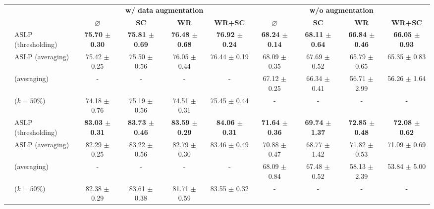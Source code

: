 \begin{table}[htbp]
  \centering
  \resizebox{16.5cm}{!} {
    \begin{tabular}{llcccccccc}
      \cmidrule[\heavyrulewidth]{3-10}
        &  & \multicolumn{4}{c}{\textbf{w/ data augmentation}} & \multicolumn{4}{c}{\textbf{w/o augmentation}} \\
       &  &  $\varnothing$ & \textbf{SC} & \textbf{WR} & \textbf{WR+SC} & $\varnothing$ & \textbf{SC} & \textbf{WR} & \textbf{WR+SC} \\
      \toprule

      \multirow{12}{*}{} \multirow{4}{*}{\textbf{Conv2}} & ASLP (thresholding) & \textbf{75.70 $\pm$ 0.30} & \textbf{75.81 $\pm$ 0.69} & \textbf{76.48 $\pm$ 0.68} & \textbf{76.92 $\pm$ 0.24} & \textbf{68.24 $\pm$ 0.14} &\textbf{ 68.11 $\pm$ 0.64} & \textbf{66.84 $\pm$ 0.46} & \textbf{66.05 $\pm$ 0.93} \\
        & ASLP (averaging)& 75.42 $\pm$ 0.25 & 75.50 $\pm$ 0.56 & 76.05 $\pm$ 0.44 & 76.44 $\pm$ 0.19 & 68.09 $\pm$ 0.35 & 67.69 $\pm$ 0.52 & 65.79 $\pm$ 0.65 & 65.35 $\pm$ 0.83 \\
        & \cite{DBLP:conf/nips/ZhouLLY19} (averaging)& - & - & - & - & 67.12 $\pm$ 0.25 & 66.34 $\pm$ 0.41 & 56.71 $\pm$ 2.99 & 56.26 $\pm$ 1.64 \\
        & \cite{DBLP:conf/cvpr/RamanujanWKFR20} ($k=50\%$) & 74.18 $\pm$ 0.76 & 75.19 $\pm$ 0.56 & 74.51 $\pm$ 0.31 & 75.45 $\pm$ 0.44 & - & - & - & - \\
      \midrule

       \multirow{4}{*}{\textbf{Conv4}} & ASLP (thresholding) & \textbf{83.03 $\pm$ 0.31} & \textbf{83.73 $\pm$ 0.46} & \textbf{83.59 $\pm$ 0.29} & \textbf{84.06 $\pm$ 0.31} & \textbf{71.64 $\pm$ 0.36} & \textbf{69.74 $\pm$ 1.37} & \textbf{72.85 $\pm$ 0.48} & \textbf{72.08 $\pm$ 0.62} \\
        & ASLP (averaging)& 82.29 $\pm$ 0.25 & 83.22 $\pm$ 0.56 & 82.79 $\pm$ 0.30 & 83.46 $\pm$ 0.49 & 70.88 $\pm$ 0.47 & 68.77 $\pm$ 1.42 & 71.82 $\pm$ 0.53 & 71.09 $\pm$ 0.69 \\
        & \cite{DBLP:conf/nips/ZhouLLY19} (averaging)& - & - & - & - & 68.09 $\pm$ 0.84 & 67.48 $\pm$ 0.52 & 58.13 $\pm$ 2.39 & 53.84 $\pm$ 5.00 \\
        & \cite{DBLP:conf/cvpr/RamanujanWKFR20} ($k=50\%$) & 82.38 $\pm$ 0.29 & 83.61 $\pm$ 0.38 & 81.71 $\pm$ 0.59 & 83.55 $\pm$ 0.32 & - & - & - & - \\
      \midrule


\end{tabular}}
\end{table}
